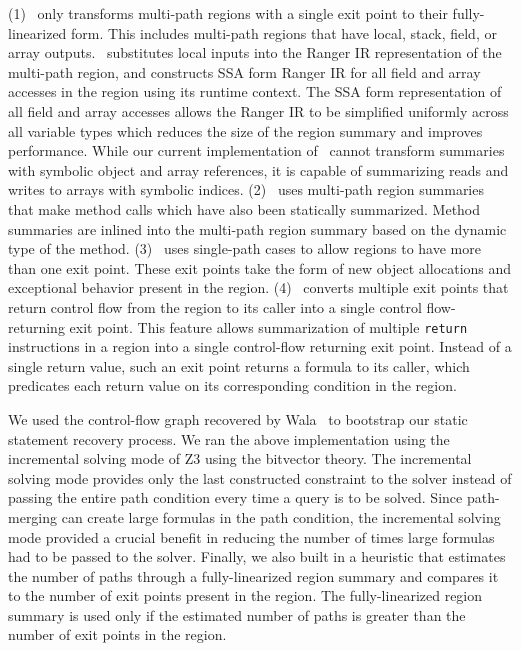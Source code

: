 (1) \tool\ only transforms multi-path regions with a single exit point to their fully-linearized form.
This includes multi-path regions that have local, stack, field, or array outputs.
%
\tool\ substitutes local inputs into the Ranger IR representation of the multi-path region, and constructs SSA form
Ranger IR for all field and array accesses in the region using its runtime context.
%
The SSA form representation of all field and array accesses allows the Ranger IR to be simplified uniformly across all
variable types which reduces the size of the region summary and improves performance.
%
While our current implementation of \tool\ cannot transform summaries with symbolic object and array
references, it is capable of summarizing reads and writes to arrays with symbolic indices.
%
(2) \tool\ uses multi-path region
summaries that make method calls which have also been statically summarized.
%
Method summaries are inlined into
the multi-path region summary based on the dynamic type of the method.
%
(3) \tool\ uses single-path cases to allow regions to have more than one exit point.
%
These exit points take the form of new object allocations and exceptional behavior present in the region.
%
(4) \tool\ converts multiple exit points that return
control flow from the region to its caller into a single control flow-returning exit point.
%
This feature allows summarization of multiple {\tt return} instructions in a region into a single control-flow
returning exit point.
%
Instead of a single return value, such an exit point returns a formula to its caller, which predicates
each return value on its corresponding condition in the region.

We used the control-flow graph recovered by Wala~\cite{Wala} to bootstrap our static statement recovery process.
%
%
%
We ran the above implementation using the incremental solving mode of Z3 using the bitvector theory.
%
The incremental solving mode provides only the last constructed constraint to the solver instead of passing the entire
path condition every time a query is to be solved.
%
Since path-merging can create large formulas in the path condition, the incremental solving mode provided a crucial
benefit in reducing the number of times large formulas had to be passed to the solver.
%
Finally, we also built in a heuristic that estimates the number of paths through a fully-linearized region summary and compares
it to the number of exit points present in the region.
%
The fully-linearized region summary is used only if the estimated number of paths is greater than the number of exit points in
the region.
%
